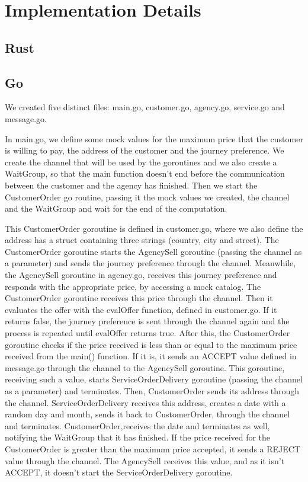 \documentclass[runningheads]{llncs}
\begin{document}
\section{Implementation Details}
\subsection{Rust}
\lipsum[1]
\subsection{Go}
We created five distinct files: main.go, customer.go, agency.go, service.go and message.go.

In main.go, we define some mock values for the maximum price that the customer is willing to pay, the address of the customer and the journey preference. We create the channel that will be used by the goroutines and we also create a WaitGroup, so that the main function doesn't end before the communication between the customer and the agency has finished. Then we start the CustomerOrder go routine, passing it the mock values we created, the channel and the WaitGroup and wait for the end of the computation.

This CustomerOrder goroutine is defined in customer.go, where we also define the address has a struct containing three strings (country, city and street). The CustomerOrder goroutine starts the AgencySell goroutine (passing the channel as a parameter) and sends the journey preference through the channel. Meanwhile, the AgencySell goroutine in agency.go, receives this journey preference and responds with the appropriate price, by accessing a mock catalog. The CustomerOrder goroutine receives this price through the channel. Then it evaluates the offer with the evalOffer function, defined in customer.go. If it returns false, the journey preference is sent through the channel again and the process is repeated until evalOffer returns true. After this, the CustomerOrder goroutine checks if the price received is less than or equal to the maximum price received from the main() function. If it is, it sends an ACCEPT value defined in message.go through the channel to the AgencySell goroutine. This goroutine, receiving such a value, starts ServiceOrderDelivery goroutine (passing the channel as a parameter) and terminates. Then, CustomerOrder sends its address through the channel. ServiceOrderDelivery receives this address, creates a date with a random day and month, sends it back to CustomerOrder, through the channel and terminates. CustomerOrder,receives the date and terminates as well, notifying the WaitGroup that it has finished. If the price received for the CustomerOrder is greater than the maximum price accepted, it sends a REJECT value through the channel. The AgencySell receives this value, and as it isn't ACCEPT, it doesn't start the ServiceOrderDelivery goroutine.
\end{document}
